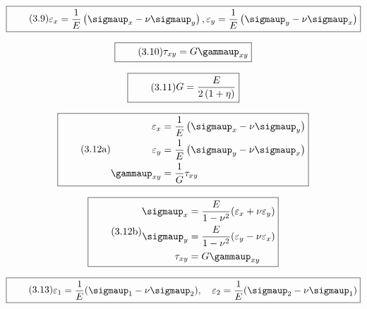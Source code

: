 \documentclass[11pt]{article}
\newcommand{\1}{ {\mathds{1}} }
\renewcommand{\epsilon}{\varepsilon}
\renewcommand{\gamma  }{\gammaup   }
\renewcommand{\sigma  }{\sigmaup   }
\begin{document}
		\begin{equation}
			\boxed{
				\tag{3.9}
				\begin{split}
			\varepsilon_x = \frac{1}{E} \left( \sigma_x - \nu\sigma_y \right), 
			\varepsilon_y = \frac{1}{E} \left( \sigma_y - \nu\sigma_x \right)
				\end{split}
			}
		\end{equation}

		\begin{equation}
			\boxed{
				\tag{3.10}
				\begin{split}
			\tau_{xy} = G \gamma_{xy}
				\end{split}
			}
		\end{equation}

		\begin{equation}
			\boxed{
				\tag{3.11}
				\begin{split}
					G = \frac{E}{2\left(1+\eta\right)}
				\end{split}
			}
		\end{equation}

		\begin{equation}
			\boxed{
				\tag{3.12a}
				\begin{split}
					\varepsilon_x &= \frac{1}{E}\left(\sigma_x - \nu \sigma_y\right)
					\\
					\varepsilon_y &= \frac{1}{E}\left(\sigma_y - \nu \sigma_x\right)
					\\
			\gamma_{xy} &= \frac{1}{G}\tau_{xy}
				\end{split}
			}
		\end{equation}

		\begin{equation}
			\boxed{
				\tag{3.12b}
				\begin{split}
					\sigma_x &= \frac{E}{1 - \nu^2}(\epsilon_x + \nu \epsilon_y) \\
					\sigma_y &= \frac{E}{1 -\nu^2}(\epsilon_y - \nu \epsilon_x) \\
					\tau_{xy} &= G \gamma_{xy}
				\end{split}
			}
		\end{equation}

		\begin{equation}
			\boxed{
				\tag{3.13}
				\begin{split}
					\epsilon_1 = \frac{1}{E}(\sigma_1 -\nu\sigma_2), \quad \epsilon_2 = \frac{1}{E}(\sigma_2 -\nu\sigma_1)
				\end{split}
			}
		\end{equation}
\end{document}
